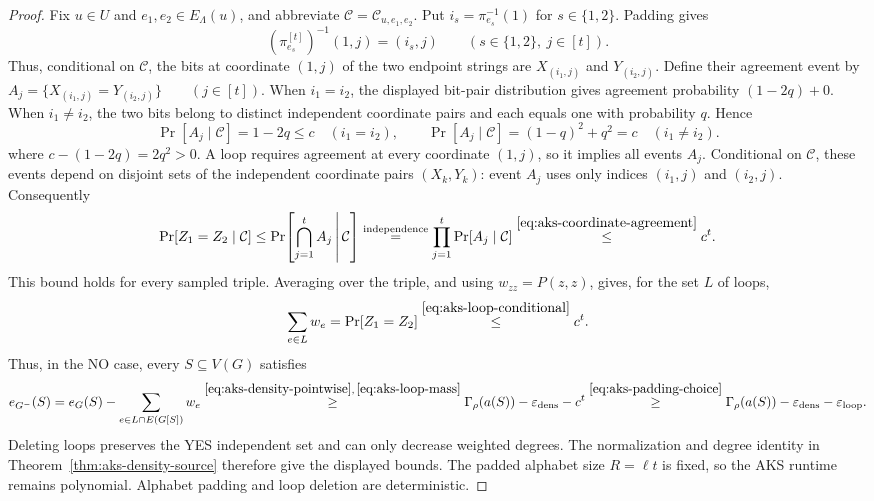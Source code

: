 \begin{proof}
Fix $u\in U$ and $e_1,e_2\in E_\Lambda(u)$, and abbreviate
$\mathcal C=\mathcal C_{u,e_1,e_2}$.
Put $i_s=\pi_{e_s}^{-1}(1)$ for $s\in\{1,2\}$. Padding gives
\[
 (\pi_{e_s}^{[t]})^{-1}(1,j)=(i_s,j)
 \qquad(s\in\{1,2\},\ j\in[t]).
\]
Thus, conditional on $\mathcal C$, the bits at coordinate $(1,j)$
of the two endpoint strings are $X_{(i_1,j)}$ and $Y_{(i_2,j)}$.
Define their agreement event by
$A_j=\{X_{(i_1,j)}=Y_{(i_2,j)}\}\qquad(j\in[t])$.
When $i_1=i_2$, the displayed bit-pair distribution gives agreement
probability $(1-2q)+0$. When $i_1\ne i_2$, the two bits belong to
distinct independent coordinate pairs and each equals one with
probability $q$. Hence
\begin{equation}\label{eq:aks-coordinate-agreement}
 \Pr[A_j\mid\mathcal C]=1-2q\le c\quad(i_1=i_2),\qquad \Pr[A_j\mid\mathcal C]=(1-q)^2+q^2=c\quad(i_1\ne i_2).
\end{equation}
where $c-(1-2q)=2q^2>0$.
A loop requires agreement at every coordinate $(1,j)$, so it implies
all events $A_j$. Conditional on $\mathcal C$, these events depend on
disjoint sets of the independent coordinate pairs $(X_k,Y_k)$:
event $A_j$ uses only indices $(i_1,j)$ and $(i_2,j)$.
Consequently
\begin{equation}\label{eq:aks-loop-conditional}
\Pr[Z_1=Z_2\mid\mathcal C]
 \le\Pr\!\left[\bigcap_{j=1}^{t}A_j\,\middle|\,\mathcal C\right]
 \overset{\text{independence}}{=}
 \prod_{j=1}^{t}\Pr[A_j\mid\mathcal C]
 \overset{\eqref{eq:aks-coordinate-agreement}}{\le}c^t.
\end{equation}
This bound holds for every sampled triple. Averaging over the triple,
and using $w_{zz}=P(z,z)$, gives, for the set $L$ of loops,
\begin{equation}\label{eq:aks-loop-mass}
 \sum_{e\in L}w_e=\Pr[Z_1=Z_2]
 \overset{\eqref{eq:aks-loop-conditional}}{\leq}c^t.
\end{equation}
Thus, in the NO case, every $S\subseteq V(G)$ satisfies
\[
 e_{G^-}(S)
 =e_G(S)-\sum_{e\in L\cap E(G[S])}w_e \overset{\eqref{eq:aks-density-pointwise},\,\eqref{eq:aks-loop-mass}}{\geq}
 \Gamma_\rho(a(S))-\varepsilon_{\mathrm{dens}}-c^t
  \overset{\eqref{eq:aks-padding-choice}}{\ge}
 \Gamma_\rho(a(S))-\varepsilon_{\mathrm{dens}}
      -\varepsilon_{\mathrm{loop}}.
\]
Deleting loops preserves the YES independent set and can only decrease
weighted degrees. The normalization and degree identity in
Theorem~\ref{thm:aks-density-source} therefore give the displayed bounds.
The padded alphabet size $R=\ell t$ is fixed, so the AKS runtime
remains polynomial. Alphabet padding and loop deletion are deterministic.
\end{proof}

